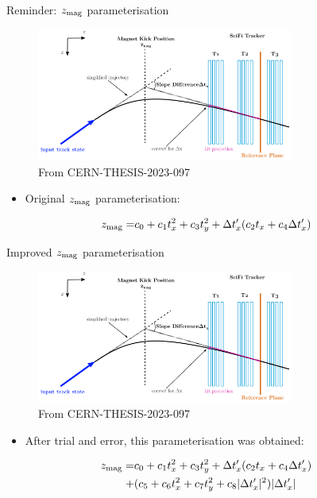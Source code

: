 \documentclass[xcolor={dvipsnames}]{beamer}
\begin{document}
\begin{frame}{Reminder: $z_{\rm mag}$ parameterisation}
  \vspace{0.0cm}
  \begin{figure}[htb]
    \centering
    \includegraphics[width=0.75\textwidth]{Plots/MagnetKinkPosition.png}
    \caption*{\small From CERN-THESIS-2023-097}
  \end{figure}

  \begin{itemize}
    \item{Original $z_{\rm mag}$ parameterisation:}
  \end{itemize}
  \begin{align*}
    z_{\rm mag} =& c_0 + c_1t_x^2 + c_3t_y^2 + \Delta t_x^\prime(c_2t_x + c_4\Delta t_x^\prime) \\
  \end{align*}
\end{frame}

\begin{frame}{Improved $z_{\rm mag}$ parameterisation}
  \vspace{0.0cm}
  \begin{figure}[htb]
    \centering
    \includegraphics[width=0.75\textwidth]{Plots/MagnetKinkPosition.png}
    \caption*{\small From CERN-THESIS-2023-097}
  \end{figure}
  \begin{itemize}
    \item{After trial and error, this parameterisation was obtained:}
  \end{itemize}
  \begin{align*}
    z_{\rm mag} =& c_0 + c_1t_x^2 + c_3t_y^2 + \Delta t_x^\prime(c_2t_x + c_4\Delta t_x^\prime) \\
    +& (c_5 + c_6t_x^2 + c_7t_y^2 + c_8\lvert\Delta t_x^\prime\rvert^2)\lvert\Delta t_x^\prime\rvert
  \end{align*}
\end{frame}
\end{document}
